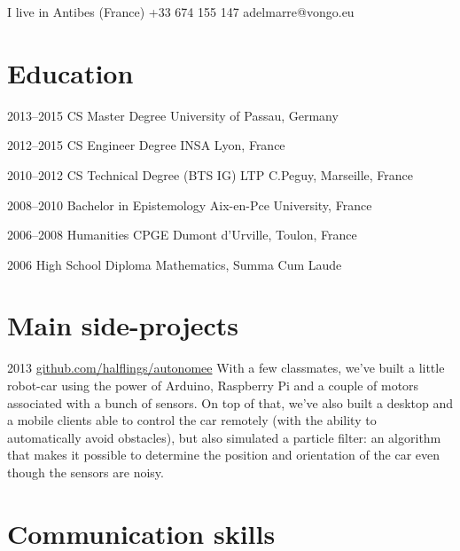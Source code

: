 \documentclass{tccv}
\begin{document}
\personal
    {I live in Antibes (France)}
    {+33 674 155 147}
    {adelmarre@vongo.eu}

\section{Education}

\begin{yearlist}

\item{2013--2015}
     {CS Master Degree}
     {University of Passau, Germany}

\item{2012--2015}
     {CS Engineer Degree}
     {INSA Lyon, France}

\item{2010--2012}
     {CS Technical Degree (BTS IG)}
     {LTP C.Peguy, Marseille, France}

\item{2008--2010}
     {Bachelor in Epistemology}
     {Aix-en-Pce University, France}

\item{2006--2008}
     {Humanities CPGE}
     {Dumont d'Urville, Toulon, France}

\item{2006}
     {High School Diploma}
     {Mathematics, Summa Cum Laude}

\end{yearlist}

\section{Main side-projects}

\begin{yearlist}

\item{2013}
     {\href{https://github.com/halflings/autonomee}{github.com/halflings/autonomee}}
     {With a few classmates, we've built a little robot-car using the power of Arduino, Raspberry Pi and a couple of motors associated with a bunch of sensors. On top of that, we've also built a desktop and a mobile clients able to control the car remotely (with the ability to automatically avoid obstacles), but also simulated a particle filter: an algorithm that makes it possible to determine the position and orientation of the car even though the sensors are noisy.}

\end{yearlist}

\section{Communication skills}
\end{document}
